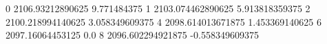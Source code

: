 0 2106.93212890625 9.771484375
1 2103.074462890625 5.913818359375
2 2100.218994140625 3.058349609375
4 2098.614013671875 1.453369140625
6 2097.16064453125 0.0
8 2096.602294921875 -0.558349609375
